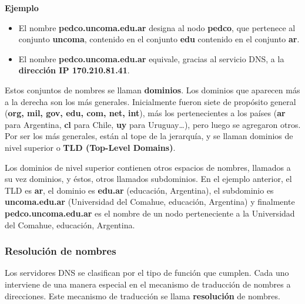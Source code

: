 \documentclass[spanish,A4,]{article}
\begin{document}
\textbf{Ejemplo}

\begin{itemize}
\itemsep1pt\parskip0pt
\item
  El nombre \textbf{pedco.uncoma.edu.ar} designa al nodo \textbf{pedco},
  que pertenece al conjunto \textbf{uncoma}, contenido en el conjunto
  \textbf{edu} contenido en el conjunto \textbf{ar}.
\item
  El nombre \textbf{pedco.uncoma.edu.ar} equivale, gracias al servicio
  DNS, a la \textbf{dirección IP 170.210.81.41}.
\end{itemize}

Estos conjuntos de nombres se llaman \textbf{dominios}. Los dominios que
aparecen más a la derecha son los más generales. Inicialmente fueron
siete de propósito general (\textbf{org, mil, gov, edu, com, net, int}),
más los pertenecientes a los países (\textbf{ar} para Argentina,
\textbf{cl} para Chile, \textbf{uy} para Uruguay\ldots{}), pero luego se
agregaron otros. Por ser los más generales, están al tope de la
jerarquía, y se llaman dominios de nivel superior o \textbf{TLD
(Top-Level Domains)}.

Los dominios de nivel superior contienen otros espacios de nombres,
llamados a su vez dominios, y éstos, otros llamados subdominios. En el
ejemplo anterior, el TLD es \textbf{ar}, el dominio es \textbf{edu.ar}
(educación, Argentina), el subdominio es \textbf{uncoma.edu.ar}
(Universidad del Comahue, educación, Argentina) y finalmente
\textbf{pedco.uncoma.edu.ar} es el nombre de un nodo perteneciente a la
Universidad del Comahue, educación, Argentina.

\subsubsection{Resolución de nombres}\label{resoluciuxf3n-de-nombres}

Los servidores DNS se clasifican por el tipo de función que cumplen.
Cada uno interviene de una manera especial en el mecanismo de traducción
de nombres a direcciones. Este mecanismo de traducción se llama
\textbf{resolución} de nombres.
\end{document}
